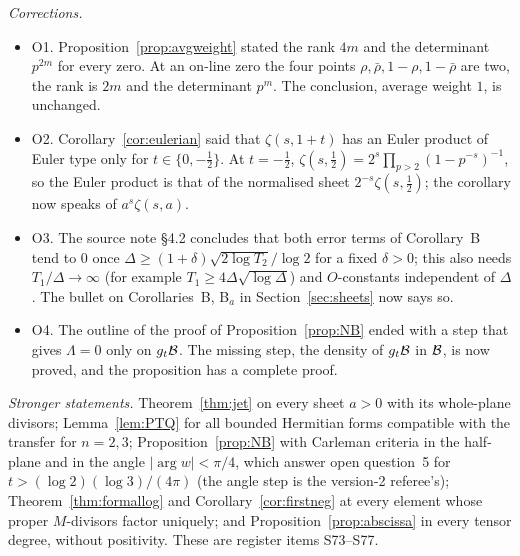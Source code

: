 \emph{Corrections.}
\begin{itemize}
\item O1. Proposition~\ref{prop:avgweight} stated the rank $4m$ and the determinant $p^{2m}$ for every zero. At an on-line zero the four points $\rho,\bar\rho,1-\rho,1-\bar\rho$ are two, the rank is $2m$ and the determinant $p^m$. The conclusion, average weight $1$, is unchanged.
\item O2. Corollary~\ref{cor:eulerian} said that $\zeta(s,1+t)$ has an Euler product of Euler type only for $t\in\{0,-\tfrac12\}$. At $t=-\tfrac12$, $\zeta(s,\tfrac12)=2^s\prod_{p>2}(1-p^{-s})^{-1}$, so the Euler product is that of the normalised sheet $2^{-s}\zeta(s,\tfrac12)$; the corollary now speaks of $a^s\zeta(s,a)$.
\item O3. The source note  §4.2 concludes that both error terms of Corollary~B tend to $0$ once $\Delta\ge(1+\delta)\sqrt{2\log T_2}/\log2$ for a fixed $\delta>0$; this also needs $T_1/\Delta\to\infty$ (for example $T_1\ge4\Delta\sqrt{\log\Delta}$) and $O$-constants independent of $\Delta$. The bullet on Corollaries~B, B$_a$ in Section~\ref{sec:sheets} now says so.
\item O4. The outline of the proof of Proposition~\ref{prop:NB} ended with a step that gives $\Lambda=0$ only on $g_t\mathcal{B}$. The missing step, the density of $g_t\mathcal{B}$ in $\mathcal{B}$, is now proved, and the proposition has a complete proof.
\end{itemize}

\emph{Stronger statements.} Theorem~\ref{thm:jet} on every sheet $a>0$ with its whole-plane divisors; Lemma~\ref{lem:PTQ} for all bounded Hermitian forms compatible with the transfer for $n=2,3$; Proposition~\ref{prop:NB} with Carleman criteria in the half-plane and in the angle $|\arg w|<\pi/4$, which answer open question~5 for $t>(\log2)(\log3)/(4\pi)$ (the angle step is the version-2 referee's); Theorem~\ref{thm:formallog} and Corollary~\ref{cor:firstneg} at every element whose proper $M$-divisors factor uniquely; and Proposition~\ref{prop:abscissa} in every tensor degree, without positivity. These are register items S73--S77.

